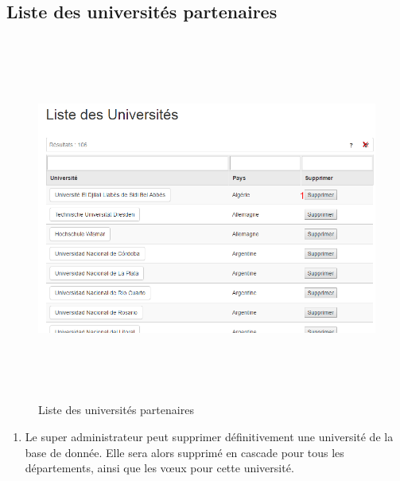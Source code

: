     \subsection{Liste des universités partenaires}
    \begin{figure}[H]
    	\centering
    	
    	\includegraphics[width=16cm,height=12cm]{Images/Super_Admin/liste_univ_super_admin}
    	\caption{Liste des universités partenaires}
    	\label{lusa}
    \end{figure}
 	
 	\begin{enumerate}
 		\item Le super administrateur peut supprimer définitivement une université de la base de donnée. Elle sera alors supprimé en cascade pour tous les départements, ainsi que les vœux pour cette université.
 	\end{enumerate}
 
